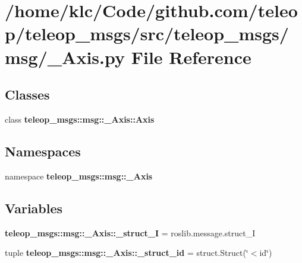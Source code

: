 \section{/home/klc/Code/github.com/teleop/teleop\_\-msgs/src/teleop\_\-msgs/msg/\_\-Axis.py File Reference}
\label{__Axis_8py}
\subsection*{Classes}
\begin{DoxyCompactItemize}
\item 
class {\bf teleop\_\-msgs::msg::\_\-Axis::Axis}
\end{DoxyCompactItemize}
\subsection*{Namespaces}
\begin{DoxyCompactItemize}
\item 
namespace {\bf teleop\_\-msgs::msg::\_\-Axis}
\end{DoxyCompactItemize}
\subsection*{Variables}
\begin{DoxyCompactItemize}
\item 
{\bf teleop\_\-msgs::msg::\_\-Axis::\_\-struct\_\-I} = roslib.message.struct\_\-I
\item 
tuple {\bf teleop\_\-msgs::msg::\_\-Axis::\_\-struct\_\-id} = struct.Struct(\char`\"{}$<$id\char`\"{})
\end{DoxyCompactItemize}

